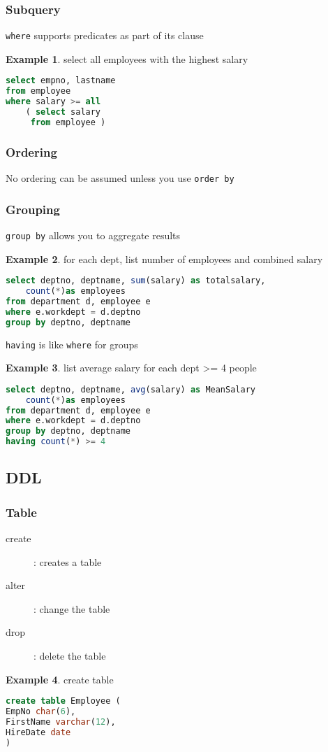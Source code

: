\documentclass[]{article}
\theoremstyle{definition}
\newtheorem{ex}{Example}[section]
\begin{document}
			\subsubsection{Subquery}
				\lstinline|where| supports predicates as part of its clause
				\begin{ex} select all employees with the highest salary
					\begin{lstlisting}[language=SQL]
select empno, lastname
from employee
where salary >= all
 	( select salary
	 from employee )				
					\end{lstlisting}
				\end{ex}
			\subsubsection{Ordering}
				No ordering can be assumed unless you use \lstinline|order by|
			\subsubsection{Grouping}
				\lstinline|group by| allows you to aggregate results
				\begin{ex} for each dept, list number of employees and combined salary
				\begin{lstlisting}[language=SQL]
select deptno, deptname, sum(salary) as totalsalary,
	count(*)as employees
from department d, employee e
where e.workdept = d.deptno 
group by deptno, deptname				
				\end{lstlisting}
				\end{ex}
				\lstinline|having| is like \lstinline|where| for groups
				\begin{ex}
					list average salary for each dept >= 4 people
					\begin{lstlisting}[language=SQL]
select deptno, deptname, avg(salary) as MeanSalary
	count(*)as employees
from department d, employee e
where e.workdept = d.deptno 
group by deptno, deptname
having count(*) >= 4
					\end{lstlisting}
				\end{ex}
	\subsection{DDL}
		\subsubsection{Table}
			\begin{description}
				\item[create]: creates a table
				\item[alter]: change the table
				\item[drop]: delete the table
			\end{description}
			\begin{ex}
				create table
				\begin{lstlisting}[language=SQL]
create table Employee (
EmpNo char(6),
FirstName varchar(12),
HireDate date
)				
				\end{lstlisting}
			\end{ex}
\end{document}
